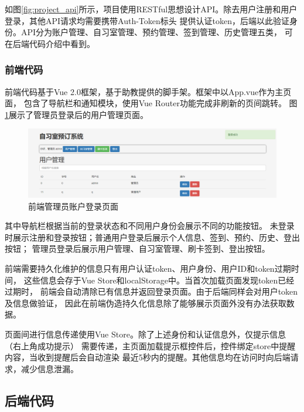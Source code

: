 如图\ref{fig:project_api}所示，项目使用RESTful思想设计API。除去用户注册和用户登录，其他API请求均需要携带Auth-Token标头
提供认证token，后端以此验证身份。API分为账户管理、自习室管理、预约管理、签到管理、历史管理五类，
可在后端代码介绍中看到。

\subsubsection{前端代码}

前端代码基于Vue 2.0框架，基于助教提供的脚手架。框架中以App.vue作为主页面，
包含了导航栏和通知模块，使用Vue Router功能完成非刷新的页间跳转。
图\ref{fig:project_admin_login}展示了管理员登录后的用户管理页面。

\begin{figure}
    \centering
    \includegraphics[width=\textwidth]{figures/project/frontend_admin_login.png}
    \caption{前端管理员账户登录页面}
    \label{fig:project_admin_login}
\end{figure}

其中导航栏根据当前的登录状态和不同用户身份会展示不同的功能按钮。
未登录时展示注册和登录按钮；普通用户登录后展示个人信息、签到、预约、历史、登出按钮；
管理员登录后展示用户管理、自习室管理、刷卡签到、登出按钮。

前端需要持久化维护的信息只有用户认证token、用户身份、用户ID和token过期时间，
这些信息会存于Vue Store和localStorage中。当首次加载页面发现token已经过期时，
前端会自动清除已有信息并返回登录页面。由于后端同样会对用户token及信息做验证，
因此在前端伪造持久化信息除了能够展示页面外没有办法获取数据。

页面间进行信息传递使用Vue Store。除了上述身份和认证信息外，仅提示信息（右上角成功提示）
需要传递，主页面加载提示框控件后，控件绑定store中提醒内容，当收到提醒后会自动渲染
最近5秒内的提醒。其他信息均在访问时向后端请求，减少信息泄漏。

\subsection{后端代码}

